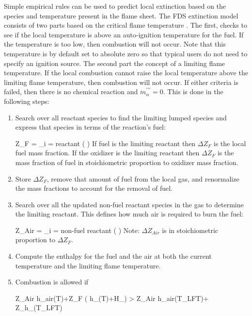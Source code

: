 Simple empirical rules can be used to predict local
extinction based on the species and temperature present in the flame sheet.  The FDS extinction model consists of two parts based on the critical flame temperature \cite{SFPE:Beyler}. The first, checks to see if the local temperature is above an auto-ignition temperature for the fuel.  If the temperature is too low, then combustion will not occur.  Note that this temperature is by default set to absolute zero so that typical users do not need to specify an ignition source.  The second part the concept of a limiting flame temperature.  If the local combustion cannot raise the local temperature above the limiting flame temperature, then combustion will not occur. If either criteria is failed, then there is no chemical reaction and $\dot{m}^{\prime\prime\prime}_{\alpha}=0$. This is done in the following steps:

\begin{enumerate}
\item Search over all reactant species to find the limiting lumped species and express that species in terms of the reaction's fuel:

\be \Delta Z_F = \min_{i \; = \; reactant} \left( \right) \ee
If fuel is the limiting reactant then $\Delta Z_F$ is the local fuel mass fraction. If the oxidizer is the limiting reactant then $\Delta Z_F$ is the mass fraction of fuel in stoichiometric proportion to oxidizer mass fraction.
\item Store $\Delta Z_F$, remove that amount of fuel from the local gas, and renormalize the mass fractions to account for the removal of fuel.
\item Search over all the updated non-fuel reactant species in the gas to determine the limiting reactant.  This defines how much air is required to burn the fuel:

\be \Delta Z_{Air} = \min_{i \; = \; non-fuel \; reactant} \left( \right) \ee
Note: $\Delta Z_{Air}$ is in stoichiometric proportion to $\Delta Z_{F}$.
\item Compute the enthalpy for the fuel and the air at both the current temperature and the limiting flame temperature.
\item Combustion is allowed if 

\be \Delta Z_{Air} h_{air}(T)+\Delta Z_F \left( h_\F(T)+\Delta H_\F \right) > \Delta Z_{Air} h_{air}(T_{LFT})+ \Delta Z_\F h_\F(T_{LFT}) \ee

\end{enumerate}

